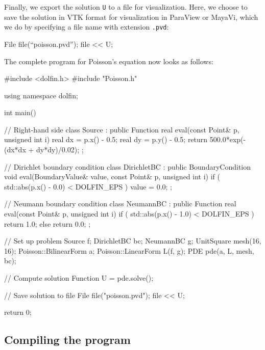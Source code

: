 Finally, we export the solution \texttt{U} to a file for
visualization. Here, we choose to save the solution in VTK format for
visualization in ParaView or MayaVi, which we do by specifying a file
name with extension \texttt{.pvd}:
\begin{code}
File file(``poisson.pvd'');
file << U;
\end{code}

The complete program for Poisson's equation now looks as follows:
\small
\begin{code}
#include <dolfin.h>
#include "Poisson.h"

using namespace dolfin;

int main()
{
  // Right-hand side                                                                                          
  class Source : public Function
  {
    real eval(const Point& p, unsigned int i)
    {
      real dx = p.x() - 0.5;
      real dy = p.y() - 0.5;
      return 500.0*exp(-(dx*dx + dy*dy)/0.02);
    }
  };

  // Dirichlet boundary condition                                                                             
  class DirichletBC : public BoundaryCondition
  {
    void eval(BoundaryValue& value, const Point& p, unsigned int i)
    {
      if ( std::abs(p.x() - 0.0) < DOLFIN_EPS )
        value = 0.0;
    }
  };

  // Neumann boundary condition                                                                               
  class NeumannBC : public Function
  {
    real eval(const Point& p, unsigned int i)
    {
      if ( std::abs(p.x() - 1.0) < DOLFIN_EPS )
        return 1.0;
      else
        return 0.0;
    }
  };

  // Set up problem                                                                                           
  Source f;
  DirichletBC bc;
  NeumannBC g;
  UnitSquare mesh(16, 16);
  Poisson::BilinearForm a;
  Poisson::LinearForm L(f, g);
  PDE pde(a, L, mesh, bc);

  // Compute solution                                                                                         
  Function U = pde.solve();

  // Save solution to file                                                                                    
  File file("poisson.pvd");
  file << U;

  return 0;
}
\end{code}
\normalsize

\subsection{Compiling the program}

